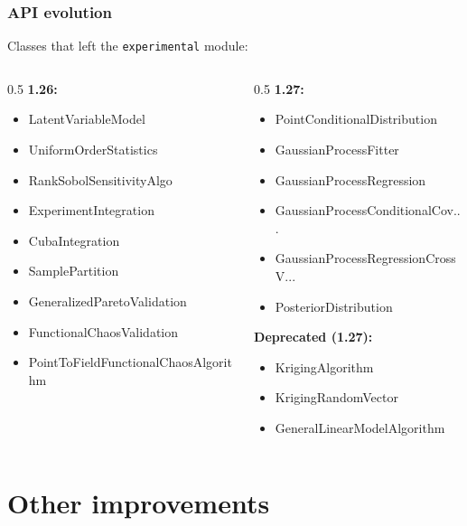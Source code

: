 \documentclass[aspectratio=169]{beamer}
\begin{document}
\begin{frame}
\frametitle{API evolution}

Classes that left the \texttt{experimental} module:

\begin{columns}[t]
\begin{column}{0.5\textwidth}
\textbf{1.26:}
\begin{itemize}
\item LatentVariableModel
\item UniformOrderStatistics
\item RankSobolSensitivityAlgo
\item ExperimentIntegration
\item CubaIntegration
\item SamplePartition
\item GeneralizedParetoValidation
\item FunctionalChaosValidation
\item PointToFieldFunctionalChaosAlgorithm
\end{itemize}
\end{column}
\begin{column}{0.5\textwidth}
\textbf{1.27:}
\begin{itemize}
\item PointConditionalDistribution
\item GaussianProcessFitter
\item GaussianProcessRegression
\item GaussianProcessConditionalCov...
\item GaussianProcessRegressionCrossV...
\item PosteriorDistribution
\end{itemize}
\vspace{1em}
\textbf{Deprecated (1.27):}
\begin{itemize}
\item KrigingAlgorithm
\item KrigingRandomVector
\item GeneralLinearModelAlgorithm
\end{itemize}
\end{column}
\end{columns}

\end{frame}


\section{Other improvements}
\end{document}
